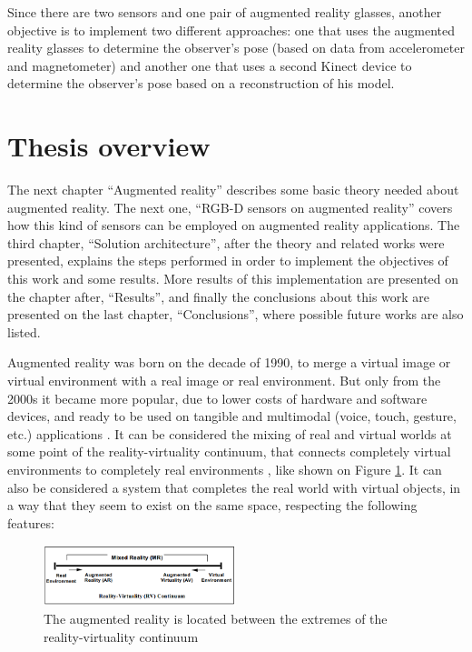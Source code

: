 \documentclass[msc, a4paper, classic, en]{ufbathesis}
\begin{document}
Since there are two sensors and one pair of augmented reality glasses, another objective is to implement two different approaches: one that
uses the augmented reality glasses to determine the observer's pose (based on data from accelerometer and magnetometer) and another one that uses a second Kinect device to determine the observer's pose based on a reconstruction of his model.

\section{Thesis overview}

The next chapter ``Augmented reality'' describes some basic theory needed about augmented reality. The next one, ``RGB-D sensors on augmented reality'' covers how this kind of sensors can be employed on augmented reality applications. The third chapter, ``Solution architecture'', after the theory and related works were presented, explains the steps performed in order to implement the objectives of this work and some results. More results of this implementation are presented on the chapter after, ``Results'', and finally the conclusions about this work are presented on the last chapter, ``Conclusions'', where possible future works are also listed.


Augmented reality was born on the decade of 1990, to merge a virtual image or virtual environment with a real image or real environment. But only from the 2000s it became more popular, due to lower costs of hardware and software devices, and ready to be used on tangible and multimodal (voice, touch, gesture, etc.) applications \cite{paddle}. It can be considered the mixing of real and virtual worlds at some point of the reality-virtuality continuum, that connects completely virtual environments to completely real environments \cite{milgram94}, like shown on Figure \ref{fig:cont}. It can also be considered a system that completes the real world with virtual objects, in a way that they seem to exist on the same space, respecting the following features:

\begin{figure}
\centering
\includegraphics[width=0.5\textwidth]{images/cont.png}
\caption{The augmented reality is located between the extremes of the reality-virtuality continuum \cite{milgram94}}
\label{fig:cont}
\end{figure}
\end{document}
